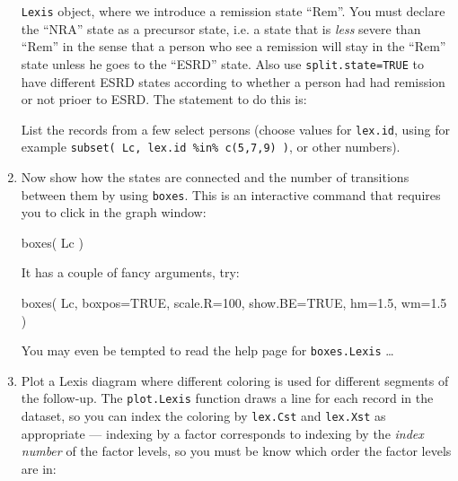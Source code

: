 \begin{enumerate}
  \texttt{Lexis} object, where we introduce a remission state ``Rem''.
  You must declare the ``NRA'' state as a precursor state, i.e. a
  state that is \emph{less} severe than ``Rem'' in the sense that a
  person who see a remission will stay in the ``Rem'' state unless he
  goes to the ``ESRD'' state. Also use \texttt{split.state=TRUE} to
  have different ESRD states according to whether a person had had
  remission or not prioer to ESRD. The statement to do this is:
\begin{Schunk}
\end{Schunk}
List the records from a few select persons (choose values for
\texttt{lex.id}, using for example \texttt{subset( Lc, lex.id \%in\%
c(5,7,9) )}, or other numbers).
\item Now show how the states are connected and the number of transitions
  between them by using \texttt{boxes}. This is an interactive command
  that requires you to click in the graph window:
\begin{Schunk}
\begin{Sinput}
 boxes( Lc )
\end{Sinput}
\end{Schunk}
It has a couple of fancy arguments, try:
\begin{Schunk}
\begin{Sinput}
 boxes( Lc, boxpos=TRUE, scale.R=100, show.BE=TRUE, hm=1.5, wm=1.5 )
\end{Sinput}
\end{Schunk}
You may even be tempted to read the help page for
\texttt{boxes.Lexis} \ldots
\item Plot a Lexis diagram where different coloring is
  used for different segments of the follow-up. The
  \texttt{plot.Lexis} function draws a line for each record in the
  dataset, so you can index the coloring by \texttt{lex.Cst} and
  \texttt{lex.Xst} as appropriate --- indexing by a factor corresponds
  to indexing by the \emph{index number} of the factor levels, so you
  must be know which order the factor levels are in:
\begin{Schunk}
\begin{Sinput}

\end{Sinput}
\end{Schunk}
\end{enumerate}
